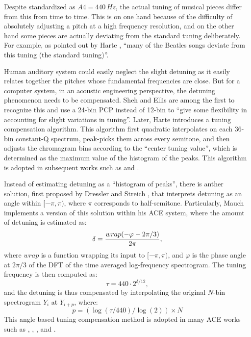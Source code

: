 Despite standardized as $A4 = 440\,Hz$, the actual tuning of musical pieces differ from this from time to time. This is on one hand because of the difficulty of absolutely adjusting a pitch at a high frequency resolution, and on the other hand some pieces are actually deviating from the standard tuning deliberately. For example, as pointed out by Harte \cite{harte2010towards}, ``many of the Beatles songs deviate from this tuning (the standard tuning)''.

Human auditory system could easily neglect the slight detuning as it easily relates together the pitches whose fundamental frequencies are close. But for a computer system, in an acoustic engineering perspective, the detuning phenomenon needs to be compensated. Sheh and Ellis \cite{sheh2003chord} are among the first to recognize this and use a 24-bin PCP instead of 12-bin to ``give some flexibility in accounting for slight variations in tuning''. Later, Harte \cite{harte2005automatic} introduces a tuning compensation algorithm. This algorithm first quadratic interpolates on each 36-bin constant-Q spectrum, peak-picks them across every semitone, and then adjusts the chromagram bins according to the ``center tuning value'', which is determined as the maximum value of the histogram of the peaks. This algorithm is adopted in subsequent works such as \cite{bello2005robust} and \cite{harte2006detecting}.

Instead of estimating detuning as a ``histogram of peaks'', there is anther solution, first proposed by Dressler and Streich \cite{dressler2007tuning}, that interprets detuning as an angle within $[-\pi,\pi)$, where $\pi$ corresponds to half-semitone. Particularly, Mauch \cite{mauch2010automatic} implements a version of this solution within his ACE system, where the amount of detuning is estimated as:
\begin{equation}\label{eq:2-tuning}
\delta = { {wrap(-\varphi-{2\pi}/3)} \over {2\pi} },
\end{equation}
where $wrap$ is a function wrapping its input to $[-\pi,\pi)$, and $\varphi$ is the phase angle at $2\pi/3$ of the DFT of the time averaged log-frequency spectrogram. The tuning frequency is then computed as:
\begin{equation}
\tau=440\cdot2^{\delta/12},
\end{equation}
and the detuning is thus compensated by interpolating the original $N$-bin spectrogram $Y_i$ at $Y_{i+p}$, where:
\begin{equation}
p = (\log(\tau / 440) / \log(2)) \times N
\end{equation}
This angle based tuning compensation method is adopted in many ACE works such as \cite{papadopoulos2007large}, \cite{papadopoulos2008simultaneous}, \cite{mauch2008discrete}, \cite{reed2009minimum} and \cite{noland2009influences}.

